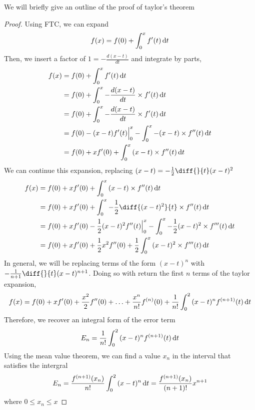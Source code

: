 \documentclass{article}
\begin{document}
\begin{remark}
    We will briefly give an outline of the proof of taylor's theorem
\end{remark}
\begin{proof}
    Using FTC, we can expand
    \[
        f(x) = f(0) + \int_{0}^{x}{f'(t) \mathop{}\!\mathrm{d} t}
    \]
    Then, we insert a factor of $1 = -\frac{d(x-t)}{dt}$ and integrate by parts,
    \begin{align*}
        f(x) &= f(0) + \int_{0}^{x}{f'(t) \mathop{}\!\mathrm{d} t} \\
        &= f(0) + \int_{0}^{x}{-\frac{d(x-t)}{dt} \times f'(t) \mathop{}\!\mathrm{d} t} \\
        &= f(0) + \int_{0}^{x}{-\frac{d(x-t)}{dt} \times f'(t) \mathop{}\!\mathrm{d} t} \\
        &= f(0) - (x-t)f'(t) \Big{|}_{0}^{x} - \int_{0}^{x}{-(x-t) \times f''(t) \mathop{}\!\mathrm{d} t} \\
        &= f(0) + xf'(0) + \int_{0}^{x}{(x-t) \times f''(t) \mathop{}\!\mathrm{d} t}
    \end{align*}
    We can continue this expansion, replacing $(x - t) = -\frac{1}{2}\diff{}{t}(x-t)^2$
    \begin{align*}
        f(x) &= f(0) + xf'(0) + \int_{0}^{x}{(x-t) \times f''(t) \diffd t} \\
        &= f(0) + xf'(0) + \int_{0}^{x}{-\frac{1}{2}\diff{(x-t)^2}{t} \times f''(t) \diffd t} \\
        &= f(0) + xf'(0) - \frac{1}{2}(x-t)^2 f''(t) \Big{|}_{0}^{x} - \int_{0}^{x}{-\frac{1}{2}(x-t)^2 \times f'''(t) \diffd t} \\
        &= f(0) + xf'(0) + \frac{1}{2}x^2 f''(0) + \frac{1}{2}\int_{0}^{x}{(x-t)^2 \times f'''(t) \diffd t}
    \end{align*}
    In general, we will be replacing terms of the form $(x - t)^n$ with $-\frac{1}{n+1} \diff{}{t}(x - t)^{n+1}$. Doing so with return the first $n$ terms of the taylor expansion,
    \[
    f(x) = f(0) + xf'(0) + \frac{x^2}{2} f''(0) + \ldots + \frac{x^n}{n!}f^{(n)}(0) + \frac{1}{n!} \int_{0}^{2}{(x-t)^n f^{(n+1)}(t) \mathop{}\!\mathrm{d} t}
    \]
    Therefore, we recover an integral form of the error term
    \[
        E_n = \frac{1}{n!} \int_{0}^{2}{(x-t)^n f^{(n+1)}(t) \mathop{}\!\mathrm{d} t}
    \]
    Using the mean value theorem, we can find a value $x_n$ in the interval that satisfies the intergral
    \[
        E_n = \frac{f^{(n+1)}(x_n)}{n!} \int_{0}^{2}{(x-t)^n \mathop{}\!\mathrm{d} t} = \frac{f^{(n+1)}(x_n)}{(n+1)!} x^{n+1}
    \]
    where $0 \leq x_n \leq x$
\end{proof}
\end{document}
